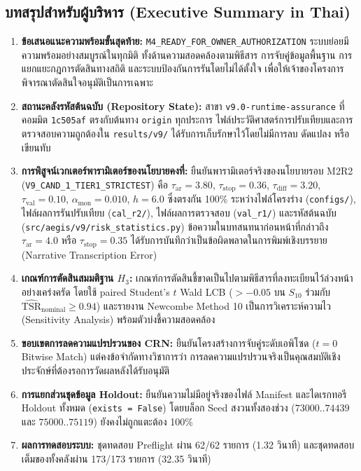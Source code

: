 \documentclass[10pt,a4paper]{article}
\begin{document}
\subsection{\thaifont บทสรุปสำหรับผู้บริหาร (Executive Summary in Thai)}
\begin{enumerate}
    \item \textbf{\thaifont ข้อเสนอแนะความพร้อมขั้นสุดท้าย:} \texttt{M4\_READY\_FOR\_OWNER\_AUTHORIZATION} {\thaifont ระบบย่อยมีความพร้อมอย่างสมบูรณ์ในทุกมิติ ทั้งด้านความสอดคล้องตามพิธีสาร การจับคู่ข้อมูลพื้นฐาน การแยกแยะกฎการตัดสินทางสถิติ และระบบป้องกันการรันโดยไม่ได้ตั้งใจ เพื่อให้เจ้าของโครงการพิจารณาตัดสินใจอนุมัติเป็นการเฉพาะ}
    \item \textbf{\thaifont สถานะคลังรหัสต้นฉบับ (Repository State):} {\thaifont สาขา \texttt{v9.0-runtime-assurance} ที่คอมมิต \texttt{1c505af} ตรงกับต้นทาง \texttt{origin} ทุกประการ ไฟล์ประวัติศาสตร์การปรับเทียบและการตรวจสอบความถูกต้องใน \texttt{results/v9/} ได้รับการเก็บรักษาไว้โดยไม่มีการลบ ดัดแปลง หรือเขียนทับ}
    \item \textbf{\thaifont การพิสูจน์เวกเตอร์พารามิเตอร์ของนโยบายคงที่:} {\thaifont ยืนยันพารามิเตอร์จริงของนโยบายรอบ M2R2 (\texttt{V9\_CAND\_1\_TIER1\_STRICTEST}) คือ $\tau_{\text{ar}}=3.80$, $\tau_{\text{stop}}=0.36$, $\tau_{\text{diff}}=3.20$, $\tau_{\text{val}}=0.10$, $\alpha_{\text{mon}}=0.010$, $h=6.0$ ซึ่งตรงกัน 100\% ระหว่างไฟล์โครงร่าง (\texttt{configs/}), ไฟล์ผลการรันปรับเทียบ (\texttt{cal\_r2/}), ไฟล์ผลการตรวจสอบ (\texttt{val\_r1/}) และรหัสต้นฉบับ (\texttt{src/aegis/v9/risk\_statistics.py}) ข้อความในบทสนทนาก่อนหน้าที่กล่าวถึง $\tau_{\text{ar}}=4.0$ หรือ $\tau_{\text{stop}}=0.35$ ได้รับการบันทึกว่าเป็นข้อผิดพลาดในการพิมพ์เชิงบรรยาย (Narrative Transcription Error)}
    \item \textbf{\thaifont เกณฑ์การตัดสินสมมติฐาน $H_3$:} {\thaifont เกณฑ์การตัดสินชี้ขาดเป็นไปตามพิธีสารที่ลงทะเบียนไว้ล่วงหน้าอย่างเคร่งครัด โดยใช้ paired Student's $t$ Wald LCB ($> -0.05$ บน $S_{10}$ ร่วมกับ $\widehat{\mathrm{TSR}}_{\mathrm{nominal}} \ge 0.94$) และรายงาน Newcombe Method 10 เป็นการวิเคราะห์ความไว (Sensitivity Analysis) พร้อมตัวบ่งชี้ความสอดคล้อง}
    \item \textbf{\thaifont ขอบเขตการลดความแปรปรวนของ CRN:} {\thaifont ยืนยันโครงสร้างการจับคู่ระดับเอพิโซด ($t=0$ Bitwise Match) แต่คงข้อจำกัดทางวิชาการว่า การลดความแปรปรวนจริงเป็นคุณสมบัติเชิงประจักษ์ที่ต้องรอการวัดผลหลังได้รับอนุมัติ}
    \item \textbf{\thaifont การแยกส่วนชุดข้อมูล Holdout:} {\thaifont ยืนยันความไม่มีอยู่จริงของไฟล์ Manifest และไดเรกทอรี Holdout ทั้งหมด (\texttt{exists = False}) โดยบล็อก Seed สงวนทั้งสองช่วง ($73000..74439$ และ $75000..75119$) ยังคงไม่ถูกแตะต้อง 100\%}
    \item \textbf{\thaifont ผลการทดสอบระบบ:} {\thaifont ชุดทดสอบ Preflight ผ่าน 62/62 รายการ (1.32 วินาที) และชุดทดสอบเต็มของทั้งคลังผ่าน 173/173 รายการ (32.35 วินาที)}
\end{enumerate}
\end{document}
